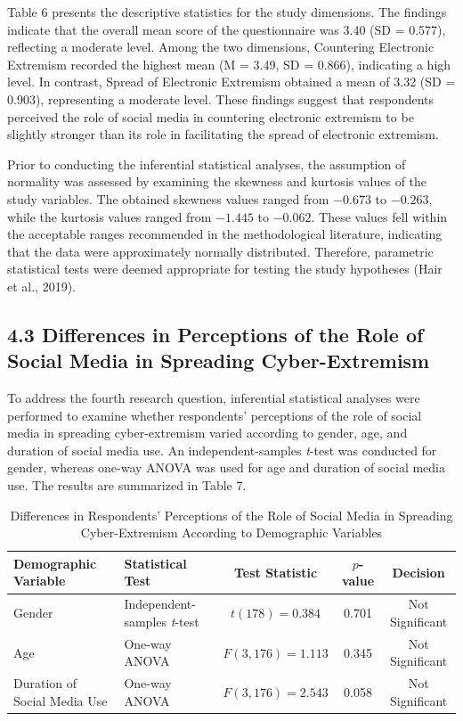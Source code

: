\documentclass[10pt]{NSP1}
\begin{document}
	Table 6 presents the descriptive statistics for the study dimensions. The findings indicate that the overall mean score of the questionnaire was 3.40 (SD = 0.577), reflecting a moderate level. Among the two dimensions, Countering Electronic Extremism recorded the highest mean (M = 3.49, SD = 0.866), indicating a high level. In contrast, Spread of Electronic Extremism obtained a mean of 3.32 (SD = 0.903), representing a moderate level. These findings suggest that respondents perceived the role of social media in countering electronic extremism to be slightly stronger than its role in facilitating the spread of electronic extremism.
	
	Prior to conducting the inferential statistical analyses, the assumption of normality was assessed by examining the skewness and kurtosis values of the study variables. The obtained skewness values ranged from $-0.673$ to $-0.263$, while the kurtosis values ranged from $-1.445$ to $-0.062$. These values fell within the acceptable ranges recommended in the methodological literature, indicating that the data were approximately normally distributed. Therefore, parametric statistical tests were deemed appropriate for testing the study hypotheses (Hair et al., 2019).
	
	\subsection*{4.3 Differences in Perceptions of the Role of Social Media in Spreading Cyber-Extremism}
	
	To address the fourth research question, inferential statistical analyses were performed to examine whether respondents' perceptions of the role of social media in spreading cyber-extremism varied according to gender, age, and duration of social media use. An independent-samples \textit{t}-test was conducted for gender, whereas one-way ANOVA was used for age and duration of social media use. The results are summarized in Table 7.
	
	\setcounter{table}{6}
	\begin{table}[H]
		\centering
		\caption{Differences in Respondents' Perceptions of the Role of Social Media in Spreading Cyber-Extremism According to Demographic Variables}
		\small
		\renewcommand{\arraystretch}{1.3}
		\begin{tabular}{|l|l|c|c|c|}
			\hline
			\textbf{Demographic Variable} & \textbf{Statistical Test} & \textbf{Test Statistic} & \textbf{$p$-value} & \textbf{Decision} \\
			\hline
			Gender & Independent-samples \textit{t}-test & $t(178) = 0.384$ & 0.701 & Not Significant \\
			Age & One-way ANOVA & $F(3,176) = 1.113$ & 0.345 & Not Significant \\
			Duration of Social Media Use & One-way ANOVA & $F(3,176) = 2.543$ & 0.058 & Not Significant \\
			\hline
		\end{tabular}
	\end{table}
	
\end{document}
